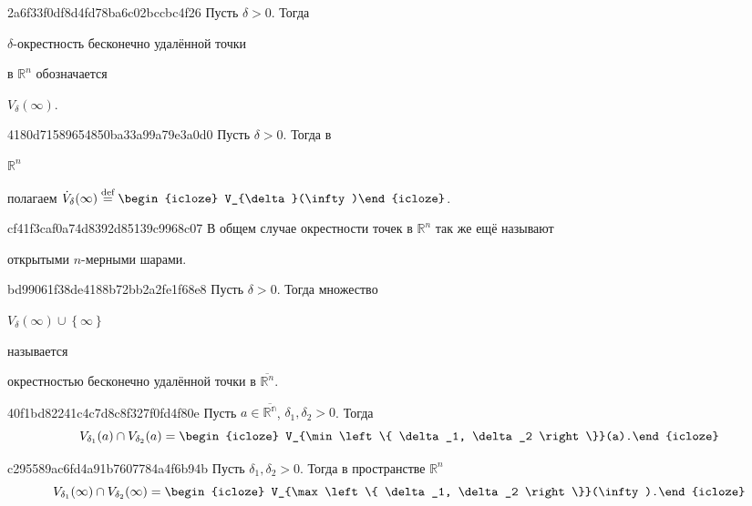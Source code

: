 \begin{note}{2a6f33f0df8d4fd78ba6c02bccbc4f26}
    Пусть \({ \delta > 0 }\). Тогда \begin{icloze}{2}\({ \delta }\)-окрестность бесконечно удалённой точки\end{icloze} в \({ \mathbb R^{n} }\) обозначается \begin{icloze}{1}\({ V_{\delta}(\infty) }\).\end{icloze}
\end{note}

\begin{note}{4180d71589654850ba33a99a79e3a0d0}
    Пусть \({ \delta > 0 }\). Тогда в \begin{icloze}{2}\({ \mathbb R^{n} }\)\end{icloze} полагаем \({ \dot V_{\delta}(\infty) \overset{\text{def}}= \begin{icloze}{1}V_{\delta}(\infty)\end{icloze} }\).
\end{note}

\begin{note}{cf41f3caf0a74d8392d85139c9968c07}
    В общем случае окрестности точек в \({ \mathbb R^{n} }\) так же ещё называют \begin{icloze}{1}открытыми \({ n }\)-мерными шарами.\end{icloze}
\end{note}

\begin{note}{bd99061f38de4188b72bb2a2fe1f68e8}
    Пусть \({ \delta >  0 }\). Тогда множество \begin{icloze}{1}\({ V_{\delta}(\infty) \cup \left\{ \infty \right\} }\)\end{icloze} называется \begin{icloze}{2}окрестностью бесконечно  удалённой точки в \({ \overline{\mathbb R^{n}} }\).\end{icloze}
\end{note}

\begin{note}{40f1bd82241c4c7d8c8f327f0fd4f80e}
    Пусть \({ a \in \mathbb \overline{\mathbb R^{n}} }\),\: \({ \delta_1, \delta_2 > 0 }\).
    Тогда
    \[
        V_{\delta_1}(a) \cap V_{\delta_2}(a) = \begin{icloze}{1}V_{\min \left\{ \delta_1, \delta_2 \right\}}(a).\end{icloze}
    \]
\end{note}

\begin{note}{c295589ac6fd4a91b7607784a4f6b94b}
    Пусть \({ \delta_1, \delta_2 > 0 }\).
    Тогда в пространстве \({ \mathbb R^{n} }\)
    \[
        V_{\delta_1}(\infty) \cap V_{\delta_2}(\infty) = \begin{icloze}{1}V_{\max \left\{ \delta_1, \delta_2 \right\}}(\infty).\end{icloze}
    \]
\end{note}

